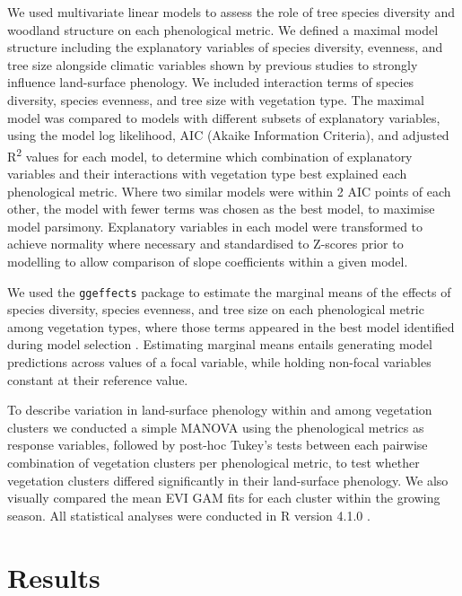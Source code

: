 \begin{refsection}
We used multivariate linear models to assess the role of tree species diversity and woodland structure on each phenological metric. We defined a maximal model structure including the explanatory variables of species diversity, evenness, and tree size alongside climatic variables shown by previous studies to strongly influence land-surface phenology. We included interaction terms of species diversity, species evenness, and tree size with vegetation type. The maximal model was compared to models with different subsets of explanatory variables, using the model log likelihood, AIC (Akaike Information Criteria), and adjusted R\textsuperscript{2} values for each model, to determine which combination of explanatory variables and their interactions with vegetation type best explained each phenological metric. Where two similar models were within 2 AIC points of each other, the model with fewer terms was chosen as the best model, to maximise model parsimony. Explanatory variables in each model were transformed to achieve normality where necessary and standardised to Z-scores prior to modelling to allow comparison of slope coefficients within a given model.

We used the \texttt{ggeffects} package to estimate the marginal means of the effects of species diversity, species evenness, and tree size on each phenological metric among vegetation types, where those terms appeared in the best model identified during model selection \citep{ggeffects}. Estimating marginal means entails generating model predictions across values of a focal variable, while holding non-focal variables constant at their reference value.

To describe variation in land-surface phenology within and among vegetation clusters we conducted a simple MANOVA using the phenological metrics as response variables, followed by post-hoc Tukey's tests between each pairwise combination of vegetation clusters per phenological metric, to test whether vegetation clusters differed significantly in their land-surface phenology. We also visually compared the mean EVI GAM fits for each cluster within the growing season. All statistical analyses were conducted in R version 4.1.0 \citep{R2020}.

\section{Results}
\label{phen:sec:results}


\end{refsection}
